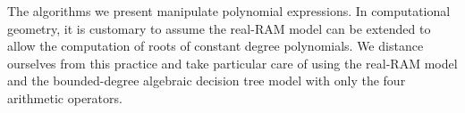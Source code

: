 The algorithms we present manipulate polynomial expressions.
%
In computational geometry, it is customary to assume the real-RAM model can be
extended to allow the computation of roots of constant degree polynomials.
We distance ourselves from this practice and take particular care
of using the real-RAM model and the bounded-degree algebraic decision tree
model with only the four arithmetic operators.
